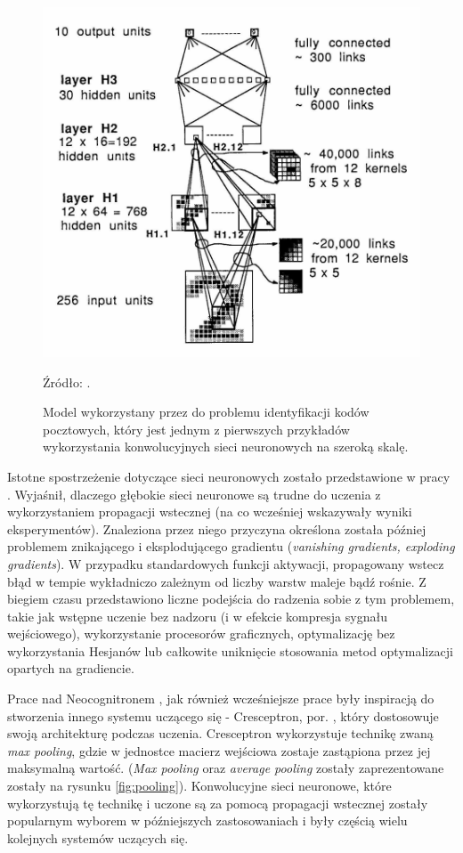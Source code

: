 \documentclass[12pt,a4paper,twoside]{article}
\newcommand{\source}[1]{\caption*{\hfill Źródło: {#1}} }
\begin{document}
\begin{figure}[h]
  \centering
\includegraphics[scale=0.6]{../obrazy/fig:lecunmnist.png}
\caption{Model wykorzystany przez \citet{lecun1989b} do problemu identyfikacji kodów pocztowych, który jest jednym z pierwszych przykładów wykorzystania konwolucyjnych sieci neuronowych na szeroką skalę. \label{fig:lecunmnist}}
\source{\citet{lecun1989b}.}
\end{figure}

Istotne spostrzeżenie dotyczące sieci neuronowych zostało przedstawione w pracy \citet{hochreiter1991}. Wyjaśnił, dlaczego głębokie sieci neuronowe są trudne do uczenia z wykorzystaniem propagacji wstecznej (na co wcześniej wskazywały wyniki eksperymentów). Znaleziona przez niego przyczyna określona została później problemem znikającego i eksplodującego gradientu (\textit{vanishing gradients, exploding gradients}). W przypadku standardowych funkcji aktywacji, propagowany wstecz błąd w tempie wykładniczo zależnym od liczby warstw maleje bądź rośnie. Z biegiem czasu przedstawiono liczne podejścia do radzenia sobie z tym problemem, takie jak wstępne uczenie bez nadzoru (i w efekcie kompresja sygnału wejściowego), wykorzystanie procesorów graficznych, optymalizację bez wykorzystania Hesjanów lub całkowite uniknięcie stosowania metod optymalizacji opartych na gradiencie.

Prace nad Neocognitronem \citep{fukushima1980}, jak również wcześniejsze prace \citep{ivakhnenko1968} były inspiracją do stworzenia innego systemu uczącego się - Cresceptron, por. \citet{weng1992}, który dostosowuje swoją architekturę podczas uczenia. Cresceptron wykorzystuje technikę zwaną \textit{max pooling}, gdzie w jednostce macierz wejściowa zostaje zastąpiona przez jej maksymalną wartość. (\textit{Max pooling} oraz \textit{average pooling} zostały zaprezentowane zostały na rysunku \ref{fig:pooling}). Konwolucyjne sieci neuronowe, które wykorzystują tę technikę i uczone są za pomocą propagacji wstecznej zostały popularnym wyborem w późniejszych zastosowaniach i były częścią wielu kolejnych systemów uczących się.
\end{document}
